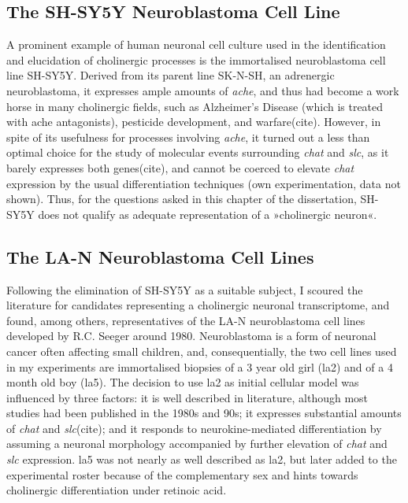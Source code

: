 \subsection{The SH-SY5Y Neuroblastoma Cell Line}
A prominent example of human neuronal cell culture used in the identification and elucidation of cholinergic processes is the immortalised neuroblastoma cell line SH-SY5Y\cite{Biedler1978}. Derived from its parent line SK-N-SH, an adrenergic neuroblastoma\cite{Biedler1973}, it expresses ample amounts of \textit{\ac{ache}}, and thus had become a work horse in many cholinergic fields, such as Alzheimer's Disease (which is treated with \ac{ache} antagonists), pesticide development, and warfare(cite). However, in spite of its usefulness for processes involving \textit{\ac{ache}}, it turned out a less than optimal choice for the study of molecular events surrounding \textit{\ac{chat}} and \textit{\ac{slc}}, as it barely expresses both genes(cite), and cannot be coerced to elevate \textit{\ac{chat}} expression by the usual differentiation techniques (own experimentation, data not shown). Thus, for the questions asked in this chapter of the dissertation, SH-SY5Y does not qualify as adequate representation of a »cholinergic neuron«.

\subsection{The LA-N Neuroblastoma Cell Lines}
Following the elimination of SH-SY5Y as a suitable subject, I scoured the literature for candidates representing a cholinergic neuronal transcriptome, and found, among others, representatives of the LA-N neuroblastoma cell lines developed by R.C. Seeger around 1980\cite{Seeger1977, Seeger1982}. Neuroblastoma is a form of neuronal cancer often affecting small children, and, consequentially, the two cell lines used in my experiments are immortalised biopsies of a 3 year old girl (\acs{la2}\cite{Seeger1977}) and of a 4 month old boy (\mbox{\acs{la5}}\cite{Seeger1982}). The decision to use \ac{la2} as initial cellular model was influenced by three factors: it is well described in literature, although most studies had been published in the 1980s and 90s; it expresses substantial amounts of \textit{\ac{chat}} and \textit{\ac{slc}}(cite); and it responds to neurokine-mediated differentiation by assuming a neuronal morphology accompanied by further elevation of \textit{\ac{chat}} and \textit{\ac{slc}} expression. \ac{la5} was not nearly as well described as \ac{la2}, but later added to the experimental roster because of the complementary sex and hints towards cholinergic differentiation under retinoic acid\cite{Hill1997}.

